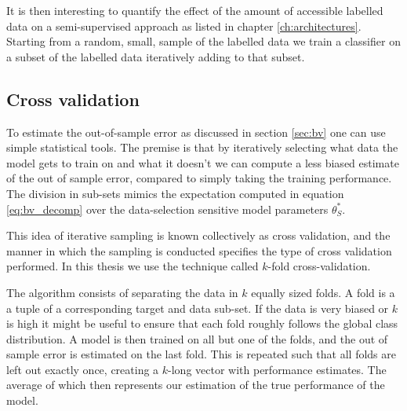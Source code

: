 It is then interesting to quantify the effect of the amount of accessible labelled data on a semi-supervised approach as listed in chapter \ref{ch:architectures}. Starting from a random, small, sample of the labelled data we train a classifier on a subset of the labelled data iteratively adding to that subset. 


\subsection{Cross validation}\label{sec:cv}

To estimate the out-of-sample error as discussed in section \ref{sec:bv} one can use simple statistical tools. The premise is that by iteratively selecting what data the model gets to train on and what it doesn't we can compute a less biased estimate of the out of sample error, compared to simply taking the training performance. The division in sub-sets mimics the expectation computed in equation \ref{eq:bv_decomp} over the data-selection sensitive model parameters $\theta_S^*$. 

This idea of iterative sampling is known collectively as cross validation, and the manner in which the sampling is conducted specifies the type of cross validation performed. In this thesis we use the technique called $k$-fold cross-validation. 

The algorithm consists of separating the data in $k$ equally sized folds. A fold is a a tuple of a corresponding target and data sub-set. If the data is very biased or $k$ is high it might be useful to ensure that each fold roughly follows the global class distribution. A model is then trained on all but one of the folds, and the out of sample error is estimated on the last fold. This is repeated such that all folds are left out exactly once, creating a $k$-long vector with performance estimates. The average of which then represents our estimation of the true performance of the model.